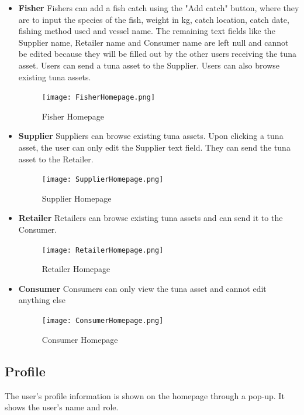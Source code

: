 \begin{itemize}
	\item \textbf{Fisher}
	Fishers can add a fish catch using the "Add catch" button, where they are to input the species of the fish, weight in kg, catch location, catch date, fishing method used and vessel name. The remaining text fields like the Supplier name, Retailer name and Consumer name are left null and cannot be edited because they will be filled out by the other users receiving the tuna asset. Users can send a tuna asset to the Supplier. Users can also browse existing tuna assets. 
	
	\begin{figure}[H]
		\centering
		\texttt{[image: FisherHomepage.png]}
		\caption{Fisher Homepage}
		\label{fig:fisherhome_page}
	\end{figure}
	
	\item \textbf{Supplier}
	Suppliers can browse existing tuna assets. Upon clicking a tuna asset, the user can only edit the Supplier text field. They can send the tuna asset to the Retailer.
	
	\begin{figure}[H]
		\centering
		\texttt{[image: SupplierHomepage.png]}
		\caption{Supplier Homepage}
		\label{fig:supplierhome_page}
	\end{figure}
	
	\item \textbf{Retailer}
	Retailers can browse existing tuna assets and can send it to the Consumer.
	
	\begin{figure}[H]
		\centering
		\texttt{[image: RetailerHomepage.png]}
		\caption{Retailer Homepage}
		\label{fig:retailerhome_page}
	\end{figure}
	
	\item \textbf{Consumer}
	Consumers can only view the tuna asset and cannot edit anything else
	
	\begin{figure}[H]
		\centering
		\texttt{[image: ConsumerHomepage.png]}
		\caption{Consumer Homepage}
		\label{fig:consumerhome_page}
	\end{figure}
	
\end{itemize}

\subsection{Profile}
The user's profile information is shown on the homepage through a pop-up. It shows the user's name and role.

